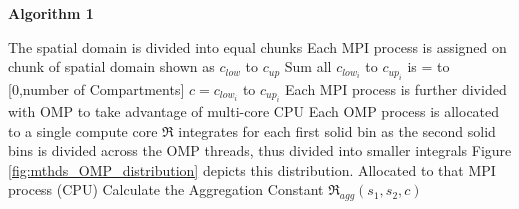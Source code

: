 \documentclass[preprint,11pt,authoryear]{elsarticle}
\begin{document}
\begin{algorithm}[H]
    \caption*{\textbf{Algorithm 1}}
    \label{alg:MyAlgorithm}
    \begin{algorithmic}[1]
        
        \State The spatial domain is divided into equal chunks
        \State Each MPI process is assigned on chunk of spatial domain shown as $c_{low}$ to $c_{up}$ 
        \State Sum all $c_{low_i}$ to $c_{up_i}$ is = to [0,number of Compartments]
         $c = c_{low_i}$ to $c_{up_i}$
        \State Each MPI process is further divided with OMP to take advantage of multi-core CPU
        \State Each OMP process is allocated to a single compute core
        \State $\Re$ integrates for each first solid bin as the second solid bins is 
        divided across the OMP threads, thus 
        divided into smaller integrals 
        Figure \ref{fig:mthds_OMP_distribution} depicts this distribution.
        \State Allocated to that MPI process (CPU)
        \State Calculate the Aggregation Constant $\Re_{agg}(s_1,s_2,c)$

\end{algorithmic}
\end{algorithm}
\end{document}
